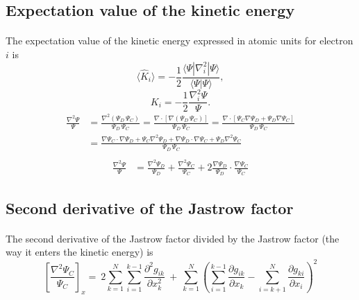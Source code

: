 \documentclass[%
twoside,                 %
final,                   %
10pt]{article}
\begin{document}
\subsection*{Expectation value of the kinetic energy}

\paragraph{}
The expectation value of the kinetic energy expressed in atomic units for electron $i$ is 
\[
 \langle \hat{K}_i \rangle = -\frac{1}{2}\frac{\langle\Psi|\nabla_{i}^2|\Psi \rangle}{\langle\Psi|\Psi \rangle},
\]
\begin{equation}
\label{kineticE}
K_i = -\frac{1}{2}\frac{\nabla_{i}^{2} \Psi}{\Psi}.
\end{equation}
\begin{align}
\frac{\nabla^2 \Psi}{\Psi} & =  \frac{\nabla^2 ({\Psi_{D} \,  \Psi_C})}{\Psi_{D} \,  \Psi_C} = \frac{\nabla  \cdot [\nabla  {(\Psi_{D} \,  \Psi_C)}]}{\Psi_{D} \,  \Psi_C} = \frac{\nabla  \cdot [ \Psi_C \nabla  \Psi_{D} + \Psi_{D} \nabla   \Psi_C]}{\Psi_{D} \,  \Psi_C}\nonumber\\
&  =  \frac{\nabla   \Psi_C \cdot \nabla  \Psi_{D} +  \Psi_C \nabla^2 \Psi_{D} + \nabla  \Psi_{D} \cdot \nabla   \Psi_C + \Psi_{D} \nabla^2  \Psi_C}{\Psi_{D} \,  \Psi_C}\nonumber\\
\end{align}
\begin{align}
\frac{\nabla^2 \Psi}{\Psi}
& =  \frac{\nabla^2 \Psi_{D}}{\Psi_{D}} + \frac{\nabla^2  \Psi_C}{ \Psi_C} + 2 \frac{\nabla  \Psi_{D}}{\Psi_{D}}\cdot\frac{\nabla   \Psi_C}{ \Psi_C}
\end{align}



\subsection*{Second derivative of the Jastrow factor}

\paragraph{}

The second derivative of the Jastrow factor divided by the Jastrow factor (the way it enters the kinetic energy) is
\[
\left[\frac{\nabla^2 \Psi_C}{\Psi_C}\right]_x =\  
2\sum_{k=1}^{N}
\sum_{i=1}^{k-1}\frac{\partial^2 g_{ik}}{\partial x_k^2}\ +\ 
\sum_{k=1}^N
\left(
\sum_{i=1}^{k-1}\frac{\partial g_{ik}}{\partial x_k} -
\sum_{i=k+1}^{N}\frac{\partial g_{ki}}{\partial x_i}
\right)^2
\]
\end{document}
